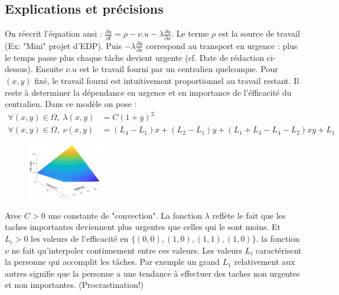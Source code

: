 \documentclass[french]{article}
\begin{document}
    \subsection{Explications et précisions}
    On réecrit l'équation ansi : $\frac{\partial u}{\partial t} = \rho - \nu.u - \lambda\frac{\partial u}{\partial x}$. 
    Le terme $\rho$ est la source de travail (Ex: "Mini" projet d'EDP). Puis $ - \lambda\frac{\partial u}{\partial x}$ 
    correspond au transport en urgence : plus le temps passe plus chaque tâche devient urgente 
    (cf. Date de rédaction ci-dessus). Ensuite $\nu.u$ est le travail fourni par un centralien quelconque. Pour $(x,y)$ fixé, le travail fourni 
    est intuitivement proportionnel au travail restant. Il reste à determiner la dépendance en urgence et en importance 
    de l'éfficacité du centralien. Dans ce modèle on pose :
    \begin{align}
        \forall(x,y)\in\Omega, \; \lambda(x,y) &= C(1+y)^2 \\
        \forall(x,y)\in\Omega, \; \nu(x,y) &= (L_4-L_1)x+(L_2-L_1)y+(L_1+L_3-L_4-L_2)xy+L_1
    \end{align}
    

    \begin{figure}
        \begin{center}
            \includegraphics[width=0.30\textwidth]{Figures/Efficacite.png}
        \end{center}
        \vspace{-40pt}
    \end{figure}

        Avec $C > 0$ une constante de "convection". La fonction $\lambda$ reflète le fait 
        que les taches importantes deviennent plus urgentes que celles qui le sont moins.
    Et $L_i > 0$ les valeurs de l'efficacité en $\{(0,0),(1,0),(1,1),(1,0)\}$. la fonction 
    $\nu$ ne fait qu'interpoler continuement entre ces valeurs. Les valeurs $L_i$ 
    caractérisent la personne qui accomplit les tâches. Par exemple un grand $L_1$ 
    relativement aux autres signifie que  la personne a une tendance à effectuer des 
    taches non urgentes et non importantes. (Procrastination!)
    
\end{document}
